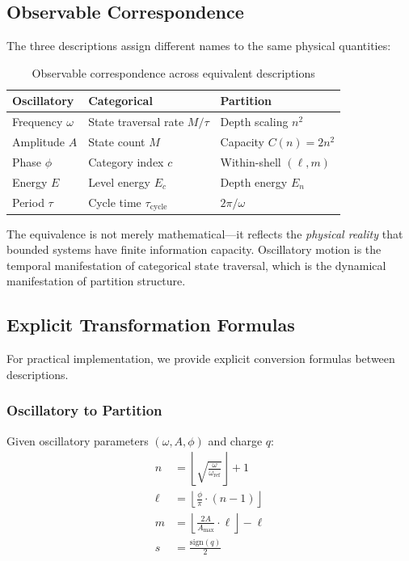 \subsection{Observable Correspondence}

The three descriptions assign different names to the same physical quantities:

\begin{table}[h]
\centering
\caption{Observable correspondence across equivalent descriptions}
\label{tab:observables}
\begin{tabular}{lll}
\toprule
\textbf{Oscillatory} & \textbf{Categorical} & \textbf{Partition} \\
\midrule
Frequency $\omega$ & State traversal rate $M/\tau$ & Depth scaling $n^2$ \\
Amplitude $A$ & State count $M$ & Capacity $C(n) = 2n^2$ \\
Phase $\phi$ & Category index $c$ & Within-shell $(\ell, m)$ \\
Energy $E$ & Level energy $E_c$ & Depth energy $E_n$ \\
Period $\tau$ & Cycle time $\tau_{\mathrm{cycle}}$ & $2\pi/\omega$ \\
\bottomrule
\end{tabular}
\end{table}

\begin{remark}
The equivalence is not merely mathematical---it reflects the \emph{physical reality} that bounded systems have finite information capacity. Oscillatory motion is the temporal manifestation of categorical state traversal, which is the dynamical manifestation of partition structure.
\end{remark}

\subsection{Explicit Transformation Formulas}

For practical implementation, we provide explicit conversion formulas between descriptions.

\subsubsection{Oscillatory to Partition}

Given oscillatory parameters $(\omega, A, \phi)$ and charge $q$:
\begin{align}
n &= \left\lfloor \sqrt{\frac{\omega}{\omega_{\mathrm{ref}}}} \right\rfloor + 1 \\
\ell &= \left\lfloor \frac{\phi}{\pi} \cdot (n-1) \right\rfloor \\
m &= \left\lfloor \frac{2A}{A_{\max}} \cdot \ell \right\rfloor - \ell \\
s &= \frac{\mathrm{sign}(q)}{2}
\end{align}

